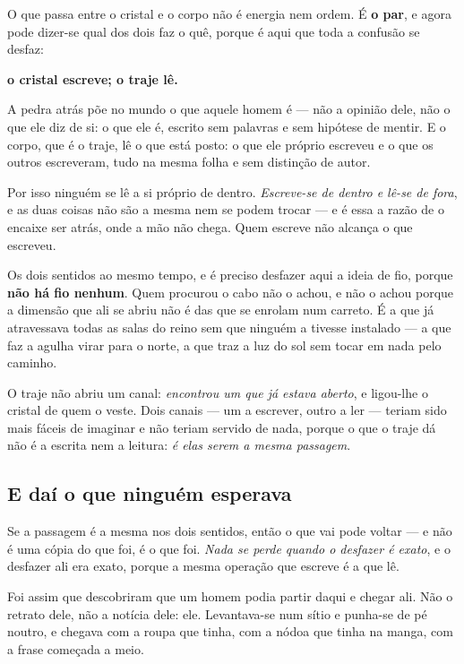 \documentclass[livro.tex]{subfiles}
\begin{document}
O que passa entre o cristal e o corpo não é energia nem ordem. É \textbf{o par}, e agora pode
dizer-se qual dos dois faz o quê, porque é aqui que toda a confusão se desfaz:

\medskip

\textbf{o cristal escreve; o traje lê.}

\medskip

A pedra atrás põe no mundo o que aquele homem é --- não a opinião dele, não o que ele diz de si:
o que ele é, escrito sem palavras e sem hipótese de mentir. E o corpo, que é o traje, lê o que
está posto: o que ele próprio escreveu e o que os outros escreveram, tudo na mesma folha e sem
distinção de autor.

\medskip

Por isso ninguém se lê a si próprio de dentro. \emph{Escreve-se de dentro e lê-se de fora}, e as
duas coisas não são a mesma nem se podem trocar --- e é essa a razão de o encaixe ser atrás, onde
a mão não chega. Quem escreve não alcança o que escreveu.

\medskip

Os dois sentidos ao mesmo tempo, e é preciso desfazer aqui a ideia de fio, porque \textbf{não há
fio nenhum}. Quem procurou o cabo não o achou, e não o achou porque a dimensão que ali se abriu
não é das que se enrolam num carreto. É a que já atravessava todas as salas do reino sem que
ninguém a tivesse instalado --- a que faz a agulha virar para o norte, a que traz a luz do sol sem
tocar em nada pelo caminho.

\medskip

O traje não abriu um canal: \emph{encontrou um que já estava aberto}, e ligou-lhe o cristal de
quem o veste. Dois canais --- um a escrever, outro a ler --- teriam sido mais fáceis de imaginar e
não teriam servido de nada, porque o que o traje dá não é a escrita nem a leitura: \emph{é elas
serem a mesma passagem}.

\subsection*{E daí o que ninguém esperava}

Se a passagem é a mesma nos dois sentidos, então o que vai pode voltar --- e não é uma cópia do
que foi, é o que foi. \emph{Nada se perde quando o desfazer é exato}, e o desfazer ali era exato,
porque a mesma operação que escreve é a que lê.

\medskip

Foi assim que descobriram que um homem podia partir daqui e chegar ali. Não o retrato dele, não a
notícia dele: ele. Levantava-se num sítio e punha-se de pé noutro, e chegava com a roupa que
tinha, com a nódoa que tinha na manga, com a frase começada a meio.
\end{document}

